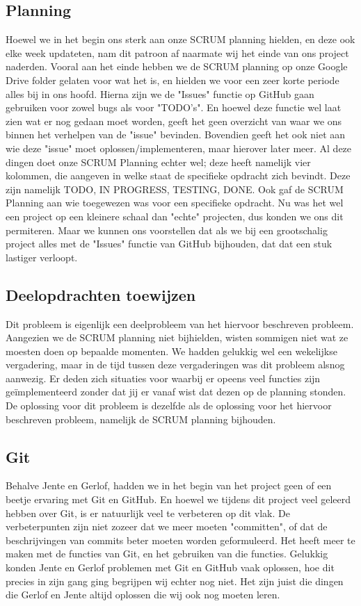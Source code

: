 \documentclass[a4paper,11pt]{article}
\begin{document}
\subsection{Planning}
Hoewel we in het begin ons sterk aan onze SCRUM planning hielden, en deze ook elke week updateten, nam dit patroon af naarmate wij het einde van ons project naderden. Vooral aan het einde hebben we de
SCRUM planning op onze Google Drive folder gelaten voor wat het is, en hielden we voor een zeer korte periode alles bij in ons hoofd. Hierna zijn we de "Issues" functie op GitHub gaan gebruiken voor zowel 
bugs als voor "TODO's". 
En hoewel deze functie wel laat zien wat er nog gedaan moet worden, geeft het geen overzicht van waar we ons binnen het verhelpen van de "issue" bevinden. Bovendien geeft het ook niet aan wie 
deze "issue" moet oplossen/implementeren, maar hierover later meer.
Al deze dingen doet onze SCRUM Planning echter wel; deze heeft namelijk vier kolommen, die aangeven in welke staat de specifieke opdracht zich bevindt. Deze zijn namelijk TODO, IN PROGRESS, TESTING, DONE.
Ook gaf de SCRUM Planning aan wie toegewezen was voor een specifieke opdracht.
Nu was het wel een project op een kleinere schaal dan "echte" projecten, dus konden we ons dit permiteren. Maar we kunnen ons voorstellen dat als we bij een grootschalig project alles met de "Issues"
functie van GitHub bijhouden, dat dat een stuk lastiger verloopt. 

\subsection{Deelopdrachten toewijzen}
Dit probleem is eigenlijk een deelprobleem van het hiervoor beschreven probleem. Aangezien we de SCRUM planning niet bijhielden, wisten sommigen niet wat ze moesten doen op bepaalde momenten. We hadden 
gelukkig wel een wekelijkse vergadering, maar in de tijd tussen deze vergaderingen was dit probleem alsnog aanwezig. Er deden zich situaties voor waarbij er opeens veel functies zijn ge\"{i}mplementeerd
zonder dat jij er vanaf wist dat dezen op de planning stonden. De oplossing voor dit probleem is dezelfde als de oplossing voor het hiervoor beschreven probleem, namelijk de SCRUM planning bijhouden.

\subsection{Git}
Behalve Jente en Gerlof, hadden we in het begin van het project geen of een beetje ervaring met Git en GitHub. En hoewel we tijdens dit project veel geleerd hebben over Git, is er natuurlijk veel te 
verbeteren op dit vlak. De verbeterpunten zijn niet zozeer dat we meer moeten "committen", of dat de beschrijvingen van commits beter moeten worden geformuleerd. Het heeft meer te maken met de functies
van Git, en het gebruiken van die functies. Gelukkig konden Jente en Gerlof problemen met Git en GitHub vaak oplossen, hoe dit precies in zijn gang ging begrijpen wij echter nog niet. Het zijn juist die
dingen die Gerlof en Jente altijd oplossen die wij ook nog moeten leren. 
\end{document}
